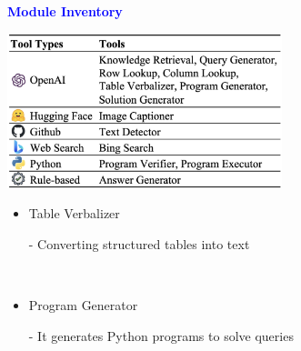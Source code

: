 \documentclass[professionalfont]{beamer}
\begin{document}
\begin{frame}

\begin{center}
    { \textbf{\textcolor{blue}{ {\fontsize{12}{14}\selectfont Module Inventory} }} }
\end{center}

\begin{center}
    \includegraphics[width=0.6\textwidth]{table/2.png}
\end{center}

\begin{itemize}
    \item Table Verbalizer

    - Converting structured tables into text

    \\[0.3cm]

    \item Program Generator

    - It generates Python programs to solve queries
\end{itemize}

\end{frame}
\end{document}

